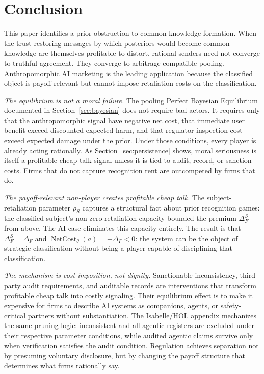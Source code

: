 \documentclass[review,authoryear]{elsarticle}
\theoremstyle{definition}
\theoremstyle{plain}
\begin{document}
\section{Conclusion}
\label{sec:conclusion}

This paper identifies a prior obstruction to common-knowledge formation.  When the trust-restoring messages by which posteriors would become common knowledge are themselves profitable to distort, rational senders need not converge to truthful agreement.  They converge to arbitrage-compatible pooling.  Anthropomorphic AI marketing is the leading application because the classified object is payoff-relevant but cannot impose retaliation costs on the classification.

\emph{The equilibrium is not a moral failure.} The pooling Perfect Bayesian Equilibrium documented in Section~\ref{sec:bayesian} does not require bad actors. It requires only that the anthropomorphic signal have negative net cost, that immediate user benefit exceed discounted expected harm, and that regulator inspection cost exceed expected damage under the prior. Under those conditions, every player is already acting rationally. As Section~\ref{sec:persistence} shows, moral seriousness is itself a profitable cheap-talk signal unless it is tied to audit, record, or sanction costs. Firms that do not capture recognition rent are outcompeted by firms that do.

\emph{The payoff-relevant non-player creates profitable cheap talk.} The subject-retaliation parameter $\rho_S$ captures a structural fact about prior recognition games: the classified subject's non-zero retaliation capacity bounded the premium $\Delta_F^S$ from above. The AI case eliminates this capacity entirely. The result is that $\Delta_F^S=\Delta_F$ and $\operatorname{NetCost}_{\theta}(a)=-\Delta_F<0$: the system can be the object of strategic classification without being a player capable of disciplining that classification.

\begin{sloppypar}
\emph{The mechanism is cost imposition, not dignity.} Sanctionable inconsistency, third-party audit requirements, and auditable records are interventions that transform profitable cheap talk into costly signaling. Their equilibrium effect is to make it expensive for firms to describe AI systems as companions, agents, or safety-critical partners without substantiation. The \hyperref[app:isabelle]{Isabelle/HOL appendix} mechanizes the same pruning logic: inconsistent and all-agentic registers are excluded under their respective parameter conditions, while audited agentic claims survive only when verification satisfies the audit condition. Regulation achieves separation not by presuming voluntary disclosure, but by changing the payoff structure that determines what firms rationally say.
\end{sloppypar}
\end{document}
